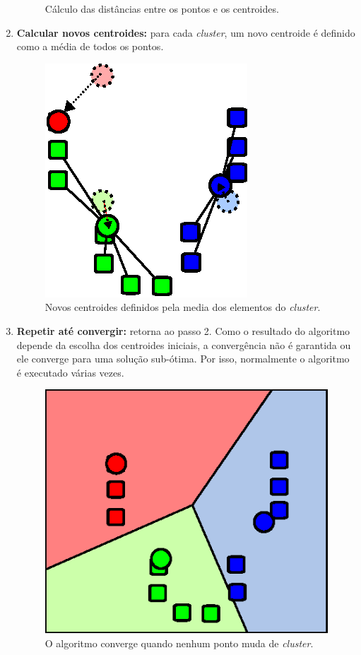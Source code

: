 \begin{enumerate}
\begin{figure}[h]
    \caption{Cálculo das distâncias entre os pontos e os centroides.}
  \end{figure}
  \item \textbf{Calcular novos centroides:} para cada \textit{cluster}, um novo centroide é definido como a média de todos os pontos.
  \begin{figure}[h]
    \centering
    \includegraphics[scale=0.6]{figuras/kmeans-3.eps}
    \caption{Novos centroides definidos pela media dos elementos do \textit{cluster}.}
  \end{figure}
  \item \textbf{Repetir até convergir:} retorna ao passo 2. Como o resultado do algoritmo depende da escolha dos centroides iniciais, a convergência não é garantida ou ele converge para uma solução sub-ótima. Por isso, normalmente o algoritmo é executado várias vezes.
  \begin{figure}[h]
    \centering
    \includegraphics[scale=0.6]{figuras/kmeans-4.eps}
    \caption{O algoritmo converge quando nenhum ponto muda de \textit{cluster}.}
  \end{figure}
\end{enumerate}

